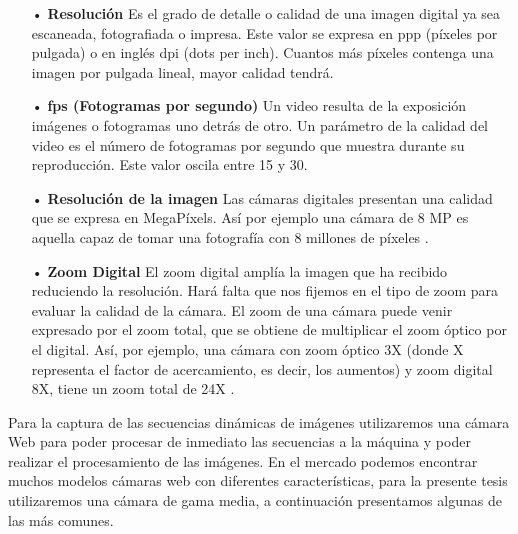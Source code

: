 \begin{itemize}
\item[•] {\bf Resolución} \vskip 0.1cm
Es el grado de detalle o calidad de una imagen digital ya sea escaneada, fotografiada o impresa. Este valor se expresa en ppp (píxeles por pulgada) o en inglés dpi (dots per inch). Cuantos más píxeles contenga una imagen por pulgada lineal, mayor calidad tendrá.
\vskip 0.1cm


\item[•] {\bf fps (Fotogramas por segundo)} \vskip 0.1cm
Un video resulta de la exposición imágenes o fotogramas uno detrás de otro. Un parámetro de la calidad del video es el número de fotogramas por segundo que muestra durante su reproducción. Este valor oscila entre 15 y 30.
\vskip 0.1cm

\item[•] {\bf Resolución de la imagen} \vskip 0.1cm
Las cámaras digitales presentan una calidad que se expresa en MegaPíxels. Así por ejemplo una cámara de 8 MP es aquella capaz de tomar una fotografía con 8 millones de píxeles \citep{Web}. 
\vskip 0.1cm


\item[•] {\bf Zoom Digital} \vskip 0.1cm
El zoom digital amplía la imagen que ha recibido reduciendo la resolución. Hará falta que nos fijemos en el tipo de zoom para evaluar la calidad de la cámara. El zoom de una cámara puede venir expresado por el zoom total, que se obtiene de multiplicar el zoom óptico por el digital. Así, por ejemplo, una cámara con zoom óptico 3X (donde X representa el factor de acercamiento, es decir, los aumentos) y zoom digital 8X, tiene un zoom total de 24X \cite{Foto}.
\vskip 0.1cm
\end{itemize}

Para la captura de las secuencias dinámicas de imágenes utilizaremos una cámara Web para poder procesar de inmediato las secuencias a la máquina y poder realizar el procesamiento de las imágenes. 
\vskip 0.1cm
En el mercado podemos encontrar muchos modelos cámaras web con diferentes características, para la presente tesis utilizaremos una cámara de gama media, a continuación presentamos algunas de las más comunes.

